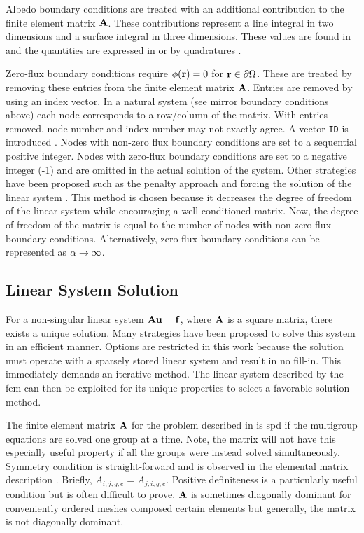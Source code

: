    Albedo boundary conditions are treated with an additional contribution to 
    the finite element matrix $\mathbf{A}$. These contributions represent a line 
    integral in two dimensions and a surface integral in three dimensions. These
    values are found in  and the quantities are 
    expressed in  or by quadratures 
    .
    
    Zero-flux boundary conditions require $\phi(\mathbf{r}) = 0$ for 
    $\mathbf{r} \in \partial \Omega$. These are treated by removing these entries from
    the finite element matrix $\mathbf{A}$. Entries are removed by using an index 
    vector. In a natural system (see mirror boundary conditions above) each node
    corresponds to a row/column of the matrix. With entries removed, node number
    and index number may not exactly agree. A vector \texttt{ID} is introduced
    \cite{textbookjohnson}. Nodes with non-zero flux boundary conditions are set
    to a sequential positive integer. Nodes with zero-flux boundary conditions 
    are set to a negative integer (-1) and are omitted in the actual solution of 
    the system. Other strategies have been proposed such as the penalty approach 
    \cite{textbookhughes} and forcing the solution of the linear system 
    \cite{textbookli}. This method is chosen because it decreases the degree of 
    freedom of the linear system while encouraging a well conditioned matrix. 
    Now, the degree of freedom of the matrix is equal to the number of nodes 
    with non-zero flux boundary conditions. Alternatively, zero-flux boundary
    conditions can be represented as $\alpha \rightarrow \infty$.
    
  \subsection{Linear System Solution}
    \label{sec:linear_system_solution}
    For a non-singular linear system $\mathbf{A} \mathbf{u} = \mathbf{f}$, where $\mathbf{A}$ is a square 
    matrix, there exists a unique solution. Many strategies have been proposed 
    to solve this system in an efficient manner. Options are restricted in this
    work because the solution must operate with a sparsely stored linear 
    system and result in no fill-in. This immediately demands an iterative 
    method. The linear system described by the \gls{fem} can then be exploited 
    for its unique properties to select a favorable solution method.
    
    The finite element matrix $\mathbf{A}$ for the problem described in 
     is \gls{spd} if the
    multigroup equations are solved one group at a time. Note, the matrix will
    not have this especially useful property if all the groups were instead 
    solved simultaneously. Symmetry condition is straight-forward and is 
    observed in the elemental matrix description . 
    Briefly, ${A_{i,j,g,e}=A_{j,i,g,e}}$.
    Positive definiteness is a particularly useful condition but is often 
    difficult to prove. $\mathbf{A}$ is sometimes diagonally dominant for conveniently
    ordered meshes composed certain elements but generally, the matrix is not 
    diagonally dominant. 
    

